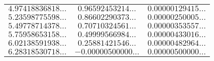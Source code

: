 \begin{table}
\begin{center}
\begin{tabular}{|c|c|c|}
$4.97418836818\ldots$ & $0.96592453214\ldots$ & $0.00000129415\ldots$ \\ 
$5.23598775598\ldots$ & $0.86602290373\ldots$ & $0.00000250005\ldots$ \\ 
$5.49778714378\ldots$ & $0.70710324561\ldots$ & $0.00000353557\ldots$ \\ 
$5.75958653158\ldots$ & $0.49999566984\ldots$ & $0.00000433016\ldots$ \\ 
$6.02138591938\ldots$ & $0.25881421546\ldots$ & $0.00000482964\ldots$ \\ 
$6.28318530718\ldots$ & $-0.00000500000\ldots$ & $0.00000500000\ldots$ \\ 
\cline{1-3}
\end{tabular}
\end{center}
\end{table}

